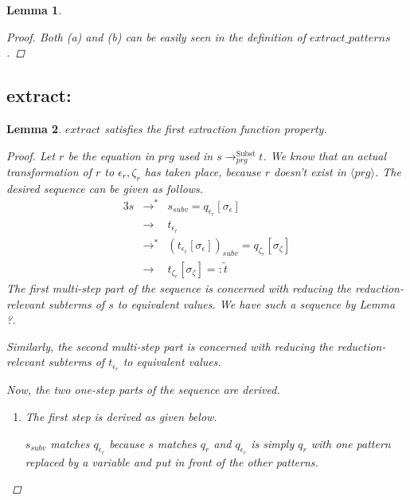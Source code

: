 \documentclass[11pt]{article} %
\newtheorem*{lemma*}{Lemma}
\begin{document}
\begin{framed}
\begin{lemma*}
\begin{proof}
Both (a) and (b) can be easily seen in the definition of $extract\_patterns$.

\end{proof}

\end{lemma*}

\subsection*{extract:}

\begin{lemma*}

$extract$ satisfies the first extraction function property.

\begin{proof}

Let $r$ be the equation in $prg$ used in $s \longrightarrow^{\textrm{Subst}}_{prg} t$. We know that an actual transformation of $r$ to $\epsilon_r, \zeta_r$ has taken place, because $r$ doesn't exist in $\langle prg \rangle$. The desired sequence can be given as follows.
\begin{alignat*}{3}
s &\longrightarrow^* &s_{subv} = q_{\epsilon_r}[\sigma_\epsilon]\\
&\longrightarrow &t_{\epsilon_r}\\
&\longrightarrow^*  &(t_{\epsilon_r}[\sigma_\epsilon])_{subv} = q_{\zeta_r}[\sigma_\zeta]\\
&\longrightarrow &t_{\zeta_r}[\sigma_\zeta] =: \widetilde{t}
\end{alignat*}
The first multi-step part of the sequence is concerned with reducing the reduction-relevant subterms of $s$ to equivalent values. We have such a sequence by Lemma ?.

Similarly, the second multi-step part is concerned with reducing the reduction-relevant subterms of $t_{\epsilon_r}$ to equivalent values.

Now, the two one-step parts of the sequence are derived.

\begin{enumerate}
\item The first step is derived as given below.
\begin{prooftree}
\end{prooftree}
$s_{subv}$ matches $q_{\epsilon_r}$ because $s$ matches $q_r$ and $q_{\epsilon_r}$ is simply $q_r$ with one pattern replaced by a variable and put in front of the other patterns.


\end{enumerate}
\end{proof}
\end{lemma*}
\end{framed}
\end{document}
